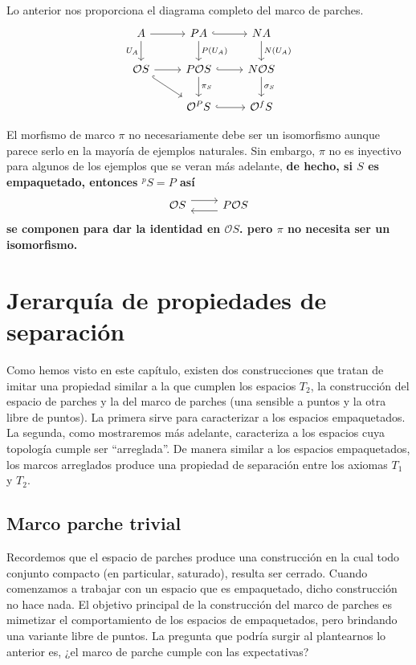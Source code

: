 Lo anterior nos proporciona el diagrama completo del marco de parches.
\[\begin{tikzcd}
	A & PA & NA \\
	{\mathcal{O}S} & {P\mathcal{O}S} & {N\mathcal{O}S} \\
	& {\mathcal{O}^PS} & {\mathcal{O}^fS}
	\arrow[from=1-1, to=1-2]
	\arrow["{U_A}"', from=1-1, to=2-1]
	\arrow[hook, from=1-2, to=1-3]
	\arrow["{P(U_A)}", from=1-2, to=2-2]
	\arrow["{N(U_A)}", from=1-3, to=2-3]
	\arrow[from=2-1, to=2-2]
	\arrow[hook, from=2-1, to=3-2]
	\arrow[hook, from=2-2, to=2-3]
	\arrow["{\pi_S}", from=2-2, to=3-2]
	\arrow["{\sigma_S}", from=2-3, to=3-3]
	\arrow[hook, from=3-2, to=3-3]
\end{tikzcd}\]

El morfismo de marco $\pi$ no necesariamente debe ser un isomorfismo aunque parece serlo en la mayoría de ejemplos naturales. Sin embargo, $\pi$ no es inyectivo para algunos de los ejemplos que se veran más adelante, \textbf{de hecho, si $S$ es empaquetado, entonces $^pS=P$ así}
\[\begin{tikzcd}
	{\mathcal{O}S} & {P\mathcal{O}S}
	\arrow[shift left=2, from=1-1, to=1-2]
	\arrow[shift left=2, from=1-2, to=1-1]
\end{tikzcd}\]
\textbf{se componen para dar la identidad en $\mathcal{O}S$. pero $\pi$ no necesita ser un isomorfismo.}

\section{Jerarquía de propiedades de separación}\label{Marcos arreglados}

Como hemos visto en este capítulo, existen dos construcciones que tratan de imitar una propiedad similar a la que cumplen los espacios $T_2$, la construcción del espacio de parches y la del marco de parches (una sensible a puntos y la otra libre de puntos). La primera sirve para caracterizar a los espacios empaquetados. La segunda, como mostraremos más adelante, caracteriza a los espacios cuya topología cumple ser ``arreglada''. De manera similar a los espacios empaquetados, los marcos arreglados produce una propiedad de separación entre los axiomas $T_1$ y $T_2$.

\subsection{Marco parche trivial}

Recordemos que el espacio de parches produce una construcción en la cual todo conjunto compacto (en particular, saturado), resulta ser cerrado. Cuando comenzamos a trabajar con un espacio que es empaquetado, dicho construcción no hace nada. El objetivo principal de la construcción del marco de parches es mimetizar el comportamiento de los espacios de empaquetados, pero brindando una variante libre de puntos. La pregunta que podría surgir al plantearnos lo anterior es, ¿el marco de parche cumple con las expectativas?\\

